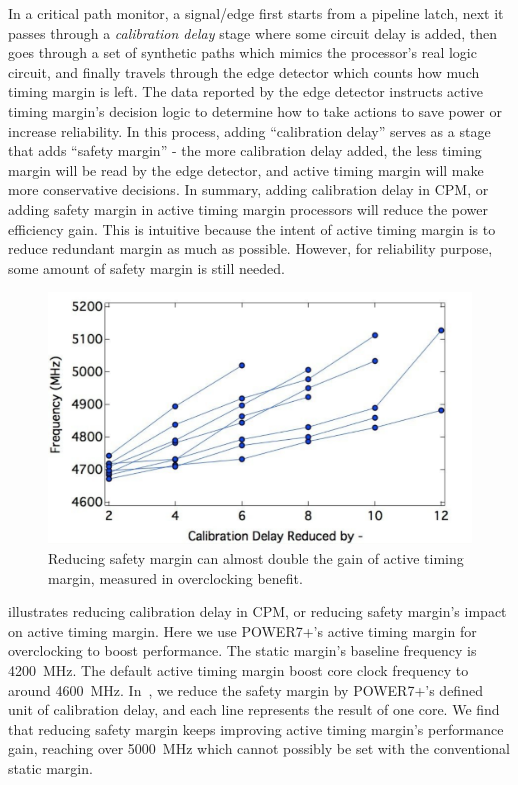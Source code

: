 In a critical path monitor, a signal/edge first starts from a pipeline latch, next it passes through a \textit{calibration delay} stage where some circuit delay is added, then goes through a set of synthetic paths which mimics the processor's real logic circuit, and finally travels through the edge detector which counts how much timing margin is left. The data reported by the edge detector instructs active timing margin's decision logic to determine how to take actions to save power or increase reliability. In this process, adding ``calibration delay'' serves as a stage that adds ``safety margin'' - the more calibration delay added, the less timing margin will be read by the edge detector, and active timing margin will make more conservative decisions. In summary, adding calibration delay in CPM, or adding safety margin in active timing margin processors will reduce the power efficiency gain. This is intuitive because the intent of active timing margin is to reduce redundant margin as much as possible. However, for reliability purpose, some amount of safety margin is still needed.

\begin{figure}[t]
  \centering
  \includegraphics[trim=0 0 0 0, clip, width=0.6\columnwidth]{graphs/cpm-delay-frequency.png}
  \caption{Reducing safety margin can almost double the gain of active timing margin, measured in overclocking benefit.}
  \label{fig:cpm-delay-frequency}
\end{figure}

 illustrates reducing calibration delay in CPM, or reducing safety margin's impact on active timing margin. Here we use POWER7+'s active timing margin for overclocking to boost performance. The static margin's baseline frequency is 4200~MHz. The default active timing margin boost core clock frequency to around 4600~MHz. In~, we reduce the safety margin by POWER7+'s defined unit of calibration delay, and each line represents the result of one core. We find that reducing safety margin keeps improving active timing margin's performance gain, reaching over 5000~MHz which cannot possibly be set with the conventional static margin.

